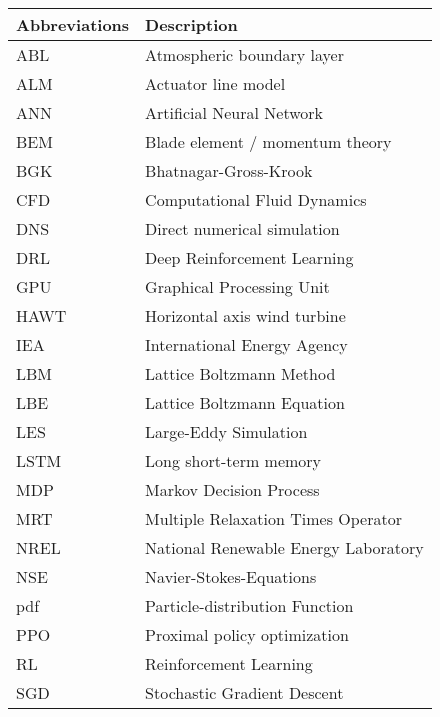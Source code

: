 \begin{longtable}{p{7cm}p{7cm}}
	Abbreviations	& Description\\ \hline
	ABL				& Atmospheric boundary layer \\
	ALM				& Actuator line model \\
	ANN				& Artificial Neural Network \\
	BEM				& Blade element / momentum theory \\
	BGK        		& Bhatnagar-Gross-Krook \\
	CFD				& Computational Fluid Dynamics \\
	DNS         	& Direct numerical simulation \\
	DRL				& Deep Reinforcement Learning \\
	GPU				& Graphical Processing Unit \\
	HAWT			& Horizontal axis wind turbine \\
	IEA				& International Energy Agency \\
	LBM         	& Lattice Boltzmann Method \\
	LBE         	& Lattice Boltzmann Equation \\
	LES         	& Large-Eddy Simulation \\
	LSTM			& Long short-term memory \\
	MDP				& Markov Decision Process \\
	MRT         	& Multiple Relaxation Times Operator \\
	NREL			& National Renewable Energy Laboratory \\
	NSE         	& Navier-Stokes-Equations \\
	pdf         	& Particle-distribution Function \\
	PPO				& Proximal policy optimization \\
	RL				& Reinforcement Learning \\
	SGD				& Stochastic Gradient Descent 
\end{longtable}
